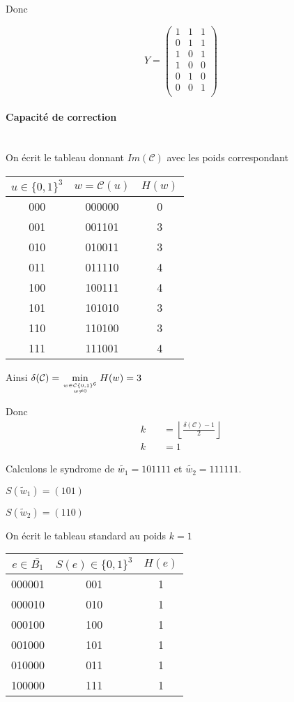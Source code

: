 \documentclass[a4paper,11pt]{article}
\begin{document}
Donc

\[
    Y=
    \left (
    \begin{array}{ccc}
        1&1&1 \\
        0&1&1 \\
        1&0&1 \\
        1&0&0 \\
        0&1&0 \\
        0&0&1 \\
    \end{array}
    \right )
\]

\paragraph{Capacité de correction}~\\
On écrit le tableau donnant $Im\mathcal{(C)}$ avec les poids correspondant
\vspace{2ex}

\begin{tabular}{|c|c|c|}
    \hline
    $u\in\{0,1\}^3$ & $w=\mathcal{C}(u)$ & $H(w)$ \\
    \hline
    000 & 000000 & 0 \\
    001 & 001101 & 3 \\
    010 & 010011 & 3 \\  
    011 & 011110 & 4 \\
    100 & 100111 & 4 \\
    101 & 101010 & 3 \\
    110 & 110100 & 3 \\
    111 & 111001 & 4 \\
    \hline
\end{tabular}

\vspace{2ex}
Ainsi $\delta\mathcal{(C)}=\min\limits_{w\in \mathcal{C}\{0,1\}^6\atop w\neq 0} H(w) = 3$ 

Donc
\[
    \begin{split}
    k\quad &=\left\lfloor\frac{\delta(\mathcal{C})-1}{2}\right\rfloor \\
    k\quad &=1
    \end{split}
\]

Calculons le syndrome de $\tilde{w_1}=101111$ et $\tilde{w_2}=111111$.

$S(\tilde{w}_1)=(101)$


$S(\tilde{w}_2)=(110)$

On écrit le tableau standard au poids $k=1$

\vspace{2ex}
\begin{tabular}{|c|c|c|}
    \hline
    $e\in\bar{B_1}$ & $S(e)\in \{0,1\}^3$ & $H(e)$ \\
    \hline
    000001 & 001 & 1 \\
    000010 & 010 & 1 \\
    000100 & 100 & 1 \\  
    001000 & 101 & 1 \\
    010000 & 011 & 1 \\
    100000 & 111 & 1 \\
    \hline
\end{tabular}
\end{document}
